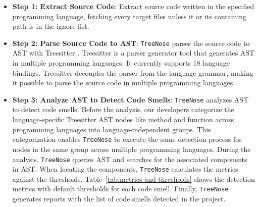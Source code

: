 \begin{itemize}[leftmargin=*]
    \item \textbf{Step 1: Extract Source Code}: Extract source code written in
        the specified programming language, fetching every target files unless
        it or its containing path is in the ignore list.
    \item \textbf{Step 2: Parse Source Code to AST}: \texttt{TreeNose} parses
        the source code to AST with Treesitter \cite{treeSitter}. Treesitter is
        a parser generator tool that generates AST in multiple programming
        languages. It currently supports 18 language bindings. Treesitter
        decouples the parser from the language grammar, making it possible to
        parse the source code in multiple programming languages.
    \item \textbf{Step 3: Analyze AST to Detect Code Smells}: \texttt{TreeNose}
        analyzes AST to detect code smells. Before the analysis, our developers
        categorize the language-specific Treesitter AST nodes like method and
        function across programming languages into language-independent groups.
        This categorization enables \texttt{TreeNose} to execute the same
        detection process for nodes in the same group across multiple
        programming languages. During the analysis, \texttt{TreeNose} queries
        AST and searches for the associated components in AST. When locating the
        components, \texttt{TreeNose} calculates the metrics against the
        thresholds. Table~\ref{tab:metrics-and-thresholds} shows the detection
        metrics with default thresholds for each code smell. Finally,
        \texttt{TreeNose} generates reports with the list of code smells
        detected in the project.
\end{itemize}


